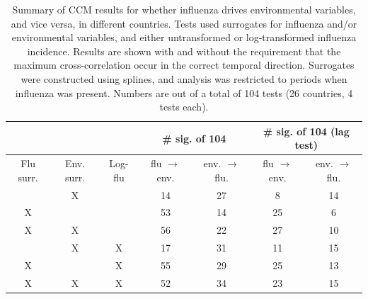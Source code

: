 \documentclass[11pt]{article}
\begin{document}
\begin{table}
\centering
\caption{
    \label{tab:summary}
    Summary of CCM results for whether influenza drives environmental variables, and vice versa, in different countries.
    Tests used surrogates for influenza and/or environmental variables,
    and either untransformed or log-transformed influenza incidence.
    Results are shown with and without the requirement that the maximum cross-correlation occur in the correct temporal direction.
    Surrogates were constructed using splines, and analysis was restricted to periods when influenza was present.
    Numbers are out of a total of 104 tests (26 countries, 4 tests each).
}
\begin{tabularx}{\textwidth}{ c | c | c | c | c | c | c}
\multicolumn{3}{c}{} & \multicolumn{2}{c}{\# sig. of 104} & \multicolumn{2}{c}{\# sig. of 104 (lag test)} \\
\hline
Flu surr. & Env. surr. & Log-flu & flu $\rightarrow$ env. & env. $\rightarrow$ flu. & flu $\rightarrow$ env. & env. $\rightarrow$ flu. \\
\hline
& X &  & 14 & 27 & 8 & 14 \\
X &  &  & 53 & 14 & 25 & 6 \\
X & X &  & 56 & 22 & 27 & 10 \\
& X & X & 17 & 31 & 11 & 15 \\
X &  & X & 55 & 29 & 25 & 13 \\
X & X & X & 52 & 34 & 23 & 15 \\
\end{tabularx}
\end{table}



\end{document}
